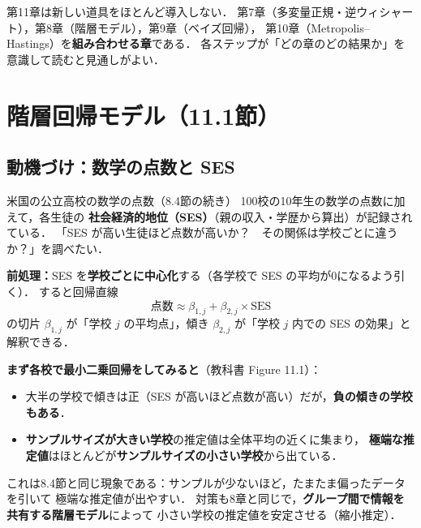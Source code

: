 \documentclass[lualatex,ja=standard,a4paper,12pt]{bxjsarticle}
\begin{document}
\begin{pointbox}
第11章は新しい道具をほとんど導入しない．
第7章（多変量正規・逆ウィシャート），第8章（階層モデル），第9章（ベイズ回帰），
第10章（Metropolis--Hastings）を\textbf{組み合わせる章}である．
各ステップが「どの章のどの結果か」を意識して読むと見通しがよい．
\end{pointbox}

\section{階層回帰モデル（11.1節）}

\subsection{動機づけ：数学の点数と SES}

\begin{exbox}{米国の公立高校の数学の点数（8.4節の続き）}
100校の10年生の数学の点数に加えて，各生徒の
\textbf{社会経済的地位（SES）}（親の収入・学歴から算出）が記録されている．
「SES が高い生徒ほど点数が高いか？　その関係は学校ごとに違うか？」を調べたい．

\medskip
\noindent\textbf{前処理：}SES を\textbf{学校ごとに中心化}する（各学校で SES の平均が0になるよう引く）．
すると回帰直線
\[
  \text{点数} \approx \beta_{1,j} + \beta_{2,j} \times \text{SES}
\]
の切片 $\beta_{1,j}$ が「学校 $j$ の平均点」，傾き $\beta_{2,j}$ が「学校 $j$ 内での SES の効果」と解釈できる．

\medskip
\noindent\textbf{まず各校で最小二乗回帰をしてみると}（教科書 Figure 11.1）：
\begin{itemize}
  \item 大半の学校で傾きは正（SES が高いほど点数が高い）だが，\textbf{負の傾きの学校もある}．
  \item \textbf{サンプルサイズが大きい学校}の推定値は全体平均の近くに集まり，
        \textbf{極端な推定値}はほとんどが\textbf{サンプルサイズの小さい学校}から出ている．
\end{itemize}
\end{exbox}

\begin{pointbox}
これは8.4節と同じ現象である：サンプルが少ないほど，たまたま偏ったデータを引いて
極端な推定値が出やすい．
対策も8章と同じで，\textbf{グループ間で情報を共有する階層モデル}によって
小さい学校の推定値を安定させる（縮小推定）．
\end{pointbox}
\end{document}
